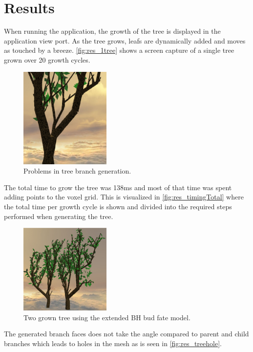 \documentclass[11pt]{article} %
\begin{document}
\section{Results}
When running the application, the growth of the tree is displayed in the application view port.
As the tree grows, leafs are dynamically added and moves as touched by a breeze.
\autoref{fig:res_1tree} shows a screen capture of a single tree grown over 20 growth cycles.
\begin{figure}[htp]
	\centering
	\includegraphics[width=0.4\textwidth]{treehole.png}
	\caption{Problems in tree branch generation.}
	\label{fig:res_treehole}
\end{figure}

The total time to grow the tree was 138ms and most of that time was spent adding points to the voxel grid.
This is visualized in \autoref{fig:res_timingTotal} where the total time per growth cycle is shown and divided into the required steps performed when generating the tree.

\begin{figure}[!htp]
	\centering
	\includegraphics[width=0.4\textwidth]{2tree.png}
	\caption{Two grown tree using the extended BH bud fate model.}
	\label{fig:res_2tree}
\end{figure}

The generated branch faces does not take the angle compared to parent and child branches which leads to holes in the mesh as is seen in \autoref{fig:res_treehole}.
\end{document}
